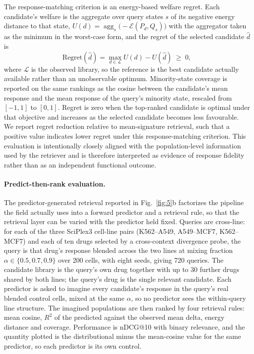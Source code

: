 \documentclass[11pt,letterpaper]{article}
\begin{document}
The response-matching criterion is an energy-based welfare regret. Each candidate's welfare is
the aggregate over query states $s$ of its negative energy distance to that state,
$U(d)=\operatorname{agg}_s\big(-\mathcal{E}(P_d,Q_s)\big)$ with the aggregator taken as the
minimum in the worst-case form, and the regret of the selected candidate $\hat d$ is
$$
\mathrm{Regret}(\hat d)=\max_{d\in\mathcal{L}}U(d)-U(\hat d)\;\ge\;0,
$$
where $\mathcal{L}$ is the observed library, so the reference is the best candidate actually
available rather than an unobservable optimum. Minority-state coverage is reported on the same
rankings as the cosine between the candidate's mean response and the mean response of the
query's minority state, rescaled from $[-1,1]$ to $[0,1]$. Regret is zero when the top-ranked
candidate is optimal under that objective and increases as the selected candidate becomes less
favourable. We report regret reduction relative to mean-signature retrieval, such that a positive
value indicates lower regret under this response-matching criterion. This evaluation is intentionally
closely aligned with the population-level information used by the retriever and is therefore
interpreted as evidence of response fidelity rather than as an independent functional outcome.

\paragraph{Predict-then-rank evaluation.}
The predictor-generated retrieval reported in Fig.~\ref{fig:5}b factorizes the pipeline the
field actually uses into a forward predictor and a retrieval rule, so that the retrieval layer
can be varied with the predictor held fixed. Queries are cross-line: for each of the three
SciPlex3 cell-line pairs (K562--A549, A549--MCF7, K562--MCF7) and each of ten drugs selected by
a cross-context divergence probe, the query is that drug's response blended across the two
lines at mixing fraction $\alpha\in\{0.5,0.7,0.9\}$ over 200 cells, with eight seeds, giving 720
queries. The candidate library is the query's own drug together with up to 30 further drugs
shared by both lines; the query's drug is the single relevant candidate. Each predictor is asked
to imagine every candidate's response in the query's real blended control cells, mixed at the
same $\alpha$, so no predictor sees the within-query line structure. The imagined populations
are then ranked by four retrieval rules: mean cosine, $R^2$ of the predicted against the
observed mean delta, energy distance and coverage. Performance is nDCG@10 with binary relevance,
and the quantity plotted is the distributional minus the mean-cosine value for the same
predictor, so each predictor is its own control.
\end{document}
